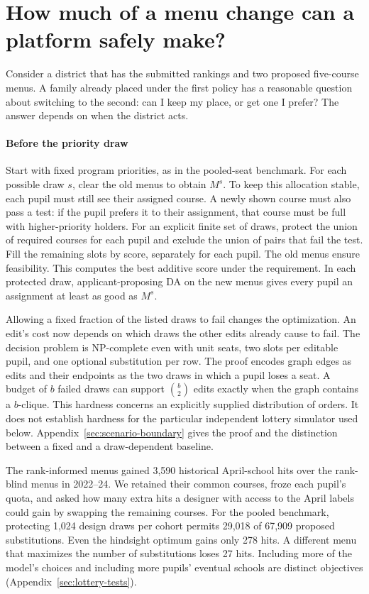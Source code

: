 \section{How much of a menu change can a platform safely make?}\label{sec:protect-main}
Consider a district that has the submitted rankings and two proposed five-course menus. A family already placed under the first policy has a reasonable question about switching to the second: can I keep my place, or get one I prefer? The answer depends on when the district acts.

\paragraph{Before the priority draw}
Start with fixed program priorities, as in the pooled-seat benchmark. For each possible draw $s$, clear the old menus to obtain $M^s$. To keep this allocation stable, each pupil must still see their assigned course. A newly shown course must also pass a test: if the pupil prefers it to their assignment, that course must be full with higher-priority holders. For an explicit finite set of draws, protect the union of required courses for each pupil and exclude the union of pairs that fail the test. Fill the remaining slots by score, separately for each pupil. The old menus ensure feasibility. This computes the best additive score under the requirement. In each protected draw, applicant-proposing DA on the new menus gives every pupil an assignment at least as good as $M^s$.

Allowing a fixed fraction of the listed draws to fail changes the optimization. An edit's cost now depends on which draws the other edits already cause to fail. The decision problem is NP-complete even with unit seats, two slots per editable pupil, and one optional substitution per row. The proof encodes graph edges as edits and their endpoints as the two draws in which a pupil loses a seat. A budget of $b$ failed draws can support $\binom b2$ edits exactly when the graph contains a $b$-clique. This hardness concerns an explicitly supplied distribution of orders. It does not establish hardness for the particular independent lottery simulator used below. Appendix~\ref{sec:scenario-boundary} gives the proof and the distinction between a fixed and a draw-dependent baseline.

The rank-informed menus gained 3,590 historical April-school hits over the rank-blind menus in 2022--24. We retained their common courses, froze each pupil's quota, and asked how many extra hits a designer with access to the April labels could gain by swapping the remaining courses. For the pooled benchmark, protecting 1,024 design draws per cohort permits 29,018 of 67,909 proposed substitutions. Even the hindsight optimum gains only 278 hits. A different menu that maximizes the number of substitutions loses 27 hits. Including more of the model's choices and including more pupils' eventual schools are distinct objectives (Appendix~\ref{sec:lottery-tests}).

